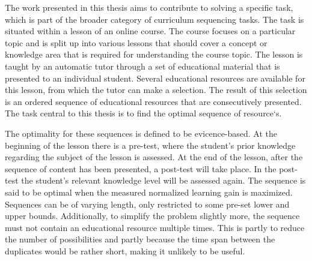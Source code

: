 %
%
The work presented in this thesis aims to contribute to solving a specific
task, which is part of the broader category of curriculum sequencing tasks.
The task is situated within a lesson of an online course. The course
focuses on a particular topic and is split up into various lessons that should
cover a concept or knowledge area that is required for understanding the
course topic. The lesson is taught by an automatic tutor through a set of
educational material that is presented to an individual student. Several
educational resources are available for this lesson, from which the tutor can
make a selection. The result of this selection is an ordered sequence of
educational resources that are consecutively presented. The task central
to this thesis is to find the optimal sequence of resource`s.

The optimality for these sequences is defined to be evicence-based. At the
beginning of the lesson there is a pre-test, where the student's prior knowledge
regarding the subject of the lesson is assessed. At the end of the lesson,
after the sequence of content has been presented, a post-test will take place.
In the post-test the student's relevant knowledge level will be assessed again.
The sequence is said to be optimal when the measured normalized learning gain
is maximized. Sequences can be of varying length, only restricted to some pre-set
lower and upper bounds. Additionally, to simplify the problem slightly more,
the sequence must not contain an educational resource multiple times. This is
partly to reduce the number of possibilities and partly because the time span
between the duplicates would be rather short, making it unlikely to be useful.

